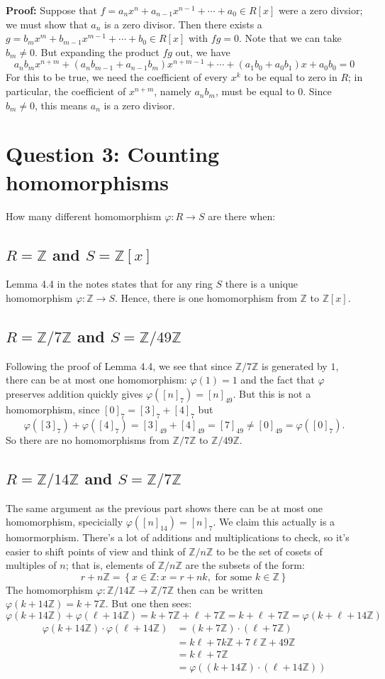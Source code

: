 \documentclass{amsart}
\newcommand{\Z}{\mathbb{Z}}
\begin{document}
{\bf Proof:} Suppose that $f=a_nx^n+a_{n-1}x^{n-1}+\cdots+a_0\in R[x]$ were a zero divsior; we must show that $a_n$ is a zero divisor.  Then there exists a $g=b_mx^m+b_{m-1}x^{m-1}+\cdots+b_0\in R[x]$ with $fg=0$.  Note that we can take $b_m\neq 0$.  But expanding the product $fg$ out, we have
$$a_nb_mx^{n+m}+(a_nb_{m-1}+a_{n-1}b_m)x^{n+m-1}+\cdots+(a_1b_0+a_0b_1)x+a_0b_0=0$$
For this to be true, we need the coefficient of every $x^k$ to be equal to zero in $R$; in particular, the coefficient of $x^{n+m}$, namely $a_nb_m$, must be equal to 0.  Since $b_m\neq 0$, this means $a_n$ is a zero divisor.

\section*{Question 3: Counting homomorphisms}
How many different homomorphism $\varphi:R\to S$ are there when:
\subsection*{$R=\Z$ and $S=\Z[x]$} Lemma 4.4 in the notes states that for any ring $S$ there is a unique homomorphism $\varphi:\Z\to S$.  Hence, there is one homomorphism from $\Z$ to $\Z[x]$.

\subsection*{$R=\Z/7\Z$ and $S=\Z/49\Z$} Following the proof of Lemma 4.4, we see that since $\Z/7\Z$ is generated by $1$, there can be at most one homomorphism: $\varphi(1)=1$ and the fact that $\varphi$ preserves addition quickly gives $\varphi([n]_7)=[n]_{49}$.  But this is not a homomorphism, since $[0]_7=[3]_7+[4]_7$ but $$\varphi([3]_7)+\varphi([4]_7)=[3]_{49}+[4]_{49}=[7]_{49}\neq [0]_{49}=\varphi([0]_7).$$  So there are no homomorphisms from $\Z/7\Z$ to $\Z/49\Z$.

\subsection*{$R=\Z/14\Z$ and $S=\Z/7\Z$} The same argument as the previous part shows there can be at most one homomorphism, specicially $\varphi([n]_{14})=[n]_7$.  We claim this actually is a homormorphism.  There's a lot of additions and multiplications to check, so it's easier to shift points of view and think of $\Z/n\Z$ to be the set of cosets of multiples of $n$; that is, elements of $\Z/n\Z$ are the subsets of the form:
$$r+n\Z=\left\{x\in \Z : x=r+nk, \text{ for some } k\in\Z\right\}$$
The homomorphism $\varphi:\Z/14\Z\to\Z/7\Z$ then can be written $\varphi(k+14\Z)=k+7\Z$.  But one then sees:
$$\varphi(k+14\Z)+\varphi(\ell+14\Z)=k+7\Z+\ell+7\Z=k+\ell+7\Z=\varphi(k+\ell+14\Z)$$
\begin{equation*}
  \begin{split}
    \varphi(k+14\Z)\cdot\varphi(\ell+14\Z)&=(k+7\Z)\cdot(\ell+7\Z)\\
    &=k\ell+7k\Z+7\ell\Z+49\Z\\
    &=k\ell+7\Z\\
    &=\varphi((k+14\Z)\cdot (\ell+14\Z))
  \end{split}
  \end{equation*}
\end{document}
